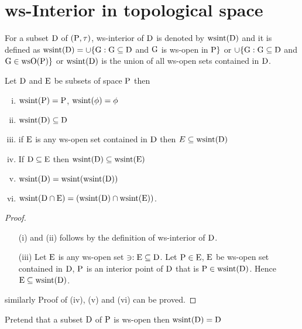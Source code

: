\section{ws-Interior in topological space}\label{sec2.4}

\begin{dfn}\label{defi2.4.1}
For a subset $\mathrm{D}$ of $(\mathrm{P},\tau)$, ws-interior of $\mathrm{D}$ is denoted by $\mathrm{wsint}(\mathrm{D})$ and it is defined as $\mathrm{wsint}(\mathrm{D})= \cup \{\mathrm{G}: \mathrm{G}\subseteq \mathrm{D}$ and $\mathrm{G}$ is ws-open in $\mathrm{P}\}$ or $\cup \{\mathrm{G}: \mathrm{G}\subseteq \mathrm{D}$ and $\mathrm{G} \in \mathrm{ws} \mathrm{O}(\mathrm{P})\}$ or $\mathrm{wsint}(\mathrm{D})$ is the union of all ws-open sets contained in $\mathrm{D}$.
\end{dfn}

\begin{thm}\label{thm2.4.1}
Let $\mathrm{D}$ and $\mathrm{E}$  be subsets of space $\mathrm{P}$ then
\begin{enumerate}[(i)]
\item $\mathrm{wsint} (\mathrm{P})=\mathrm{P}$, $\mathrm{wsint}(\phi)=\phi$
\item $\mathrm{wsint}(\mathrm{D})\subseteq \mathrm{D}$
\item if $\mathrm{E}$ is any ws-open set contained in $\mathrm{D}$ then $E\subseteq \mathrm{wsint}(\mathrm{D})$
\item If $\mathrm{D}\subseteq \mathrm{E}$ then $\mathrm{wsint}(\mathrm{D})\subseteq \mathrm{wsint}(\mathrm{E})$
\item $\mathrm{wsint}(\mathrm{D})=\mathrm{wsint}(\mathrm{wsint}(\mathrm{D}))$
\item $\mathrm{wsint}(\mathrm{D}\cap \mathrm{E})=(\mathrm{wsint}(\mathrm{D})\cap \mathrm{wsint}(\mathrm{E}))$.
\end{enumerate}
\end{thm}

\begin{proof}
\begin{itemize}
\item[(i)] and (ii) follows by the definition of ws-interior of $\mathrm{D}$.
\item[(iii)] Let $\mathrm{E}$ is any ws-open set $\ni: \mathrm{E}\subseteq \mathrm{D}$. Let $\mathrm{P}\in\mathrm{E}$, $\mathrm{E}$  be ws-open set contained in $\mathrm{D}$, $\mathrm{P}$ is an interior point of $\mathrm{D}$ that is $\mathrm{P}\in \mathrm{wsint}(\mathrm{D})$. Hence $\mathrm{E}\subseteq \mathrm{wsint}(\mathrm{D})$.
\end{itemize}
similarly Proof of (iv), (v) and (vi) can be proved.
\end{proof}

\begin{thm}\label{thm2.4.2}
Pretend that a subset $\mathrm{D}$ of $\mathrm{P}$ is ws-open then $\mathrm{wsint}(\mathrm{D})=\mathrm{D}$
\end{thm}

